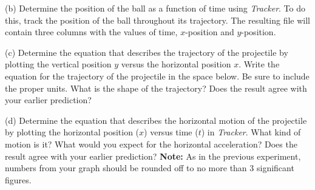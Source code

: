 %

(b) Determine the position of the ball as a function of time using \textit{Tracker}. To do this, 
track the position of the ball throughout its trajectory.  The resulting file will contain three columns 
with the values of time, $x$-position and $y$-position.

(c) Determine the equation that describes the trajectory of the projectile by plotting the vertical 
position $y$ versus the horizontal position $x$. Write the equation for the trajectory of the projectile in the space below. Be sure to include the proper units. What is the shape of the trajectory? Does the result agree with your earlier prediction?
\vspace{10mm}

(d) Determine the equation that describes the horizontal motion of the projectile by plotting the horizontal position ($x$) versus time ($t$) in \textit{Tracker}.
What kind of motion is it? What would you expect for the horizontal acceleration? Does the result agree with your earlier prediction?
\textbf{Note:} As in the previous experiment, numbers from your graph should be rounded off to no more than 3 significant figures.
\vspace{8mm}

